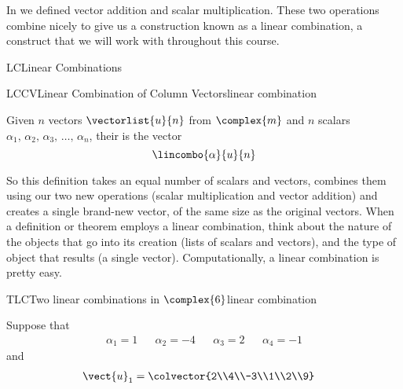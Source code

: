 %
\begin{introduction}
\begin{para}In  we defined vector addition and scalar multiplication.  These two operations combine nicely to give us a construction known as a linear combination, a construct that we will work with throughout this course.\end{para}
\end{introduction}
%
\begin{subsect}{LC}{Linear Combinations}
%
%
\begin{definition}{LCCV}{Linear Combination of Column Vectors}{linear combination}
\begin{para}Given $n$ vectors $\vectorlist{u}{n}$ from $\complex{m}$ and $n$ scalars $\alpha_1,\,\alpha_2,\,\alpha_3,\,\ldots,\,\alpha_n$, their  is the vector
%
\begin{equation*}
\lincombo{\alpha}{u}{n}
\end{equation*}
\end{para}
%
\end{definition}
%
\begin{para}So this definition takes an equal number of scalars and vectors, combines them using our two new operations (scalar multiplication and vector addition) and creates a single brand-new vector, of the same size as the original vectors.  When a definition or theorem employs a linear combination, think about the nature of the objects that go into its creation (lists of scalars and vectors), and the type of object that results (a single vector).  Computationally, a linear combination is pretty easy.\end{para}
%
\begin{example}{TLC}{Two linear combinations in $\complex{6}$}{linear combination}
\begin{para}Suppose that
%
\begin{align*}
\alpha_1=1&&\alpha_2=-4&&\alpha_3=2&&\alpha_4=-1
\end{align*}
%
and
%
\begin{align*}
\vect{u}_1&=\colvector{2\\4\\-3\\1\\2\\9}&

\end{align*}
\end{para}
\end{example}
\end{subsect}

